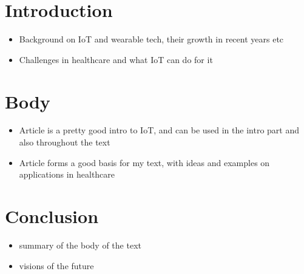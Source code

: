 \section{Introduction}
\label{sec:introduction}

\begin{itemize}
\item Background on IoT and wearable tech, their growth in recent years etc
\item Challenges in healthcare and what IoT can do for it
\end{itemize}


\section{Body}
\label{sec:body}

\begin{itemize}
\item Article \cite{Gubbi2013} is a pretty good intro to IoT, and can be
used in the intro part and also throughout the text
\item Article \cite{Bui2011} forms a good basis for my text, with ideas and
examples on applications in healthcare
\end{itemize}

\section{Conclusion}
\label{sec:conclusion}

\begin{itemize}
\item summary of the body of the text
\item visions of the future
\end{itemize}
